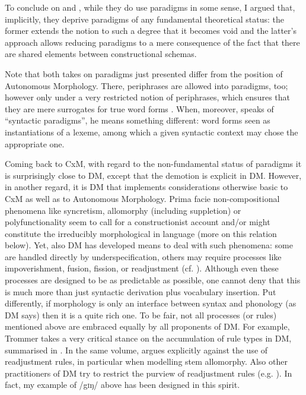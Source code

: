 \documentclass[output=paper]{langsci/langscibook}
\begin{document}
To conclude on \citet{Haspelmath2000} and \citet{Booij2016}, while they do use paradigms in some sense, I argued that, implicitly, they deprive paradigms of any fundamental theoretical status: the former extends the notion to such a degree that it becomes void and the latter’s approach allows reducing paradigms to a mere consequence of the fact that there are shared elements between constructional schemas.

\begin{sloppypar}
Note that both takes on paradigms just presented differ from the position of Autonomous Morphology. There, periphrases are allowed into paradigms, too; however only under a very restricted notion of periphrases, which ensures that they are mere surrogates for true word forms \citep{BrownBrown2012}. When, moreover, \citet[147--148]{Stump2002} speaks of “syntactic paradigms”, he means something different: word forms seen as instantiations of a lexeme, among which a given syntactic context may chose the appropriate one.
\end{sloppypar}

Coming back to CxM, with regard to the non-fundamental status of paradigms it is surprisingly close to DM, except that the demotion is explicit in DM. However, in another regard, it is DM that implements considerations otherwise basic to CxM as well as to Autonomous Morphology. Prima facie non-compositional phenomena like syncretism, allomorphy (including suppletion) or polyfunctionality seem to call for a constructionist account and/or might constitute the irreducibly morphological in language (more on this relation below). Yet, also DM has developed means to deal with such phenomena: some are handled directly by underspecification, others may require processes like impoverishment, fusion, fission, or readjustment (cf. ). Although even these processes are designed to be as predictable as possible, one cannot deny that this is much more than just syntactic derivation plus vocabulary insertion. Put differently, if morphology is only an interface between syntax and phonology (as DM says) then it is a quite rich one. To be fair, not all processes (or rules) mentioned above are embraced equally by all proponents of DM. For example, Trommer takes a very critical stance on the accumulation of rule types in DM, summarised in \citet[61]{Trommer2016}. In the same volume, \citet{Haugen2016} argues explicitly against the use of readjustment rules, in particular when modelling stem allomorphy. Also other practitioners of DM try to restrict the purview of readjustment rules (e.g. \citealt[475]{PominoPomino2019}). In fact, my example of /g\textsc{i}ŋ/ above has been designed in this spirit.
\end{document}
